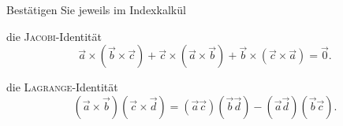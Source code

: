 \begin{atiTask}[
  title = Die Identitäten von JACOBI und LAGRANGE
]
Bestätigen Sie jeweils im Indexkalkül
\begin{atiSubtasks}
\item die \textsc{Jacobi}-Identität
\[\vec{a}\times (\vec{b}\times \vec{c})+\vec{c}\times (\vec{a}\times \vec{b})+\vec{b}\times (\vec{c}\times \vec{a})=\vec{0}.
\]
\item die \textsc{Lagrange}-Identität
\[(\vec{a}\times \vec{b})(\vec{c}\times \vec{d})=(\vec{a}\vec{c})(\vec{b}\vec{d})-(\vec{a}\vec{d})(\vec{b}\vec{c}).
\]
\end{atiSubtasks}

\end{atiTask}

\begin{atiSolution}
	
\end{atiSolution}